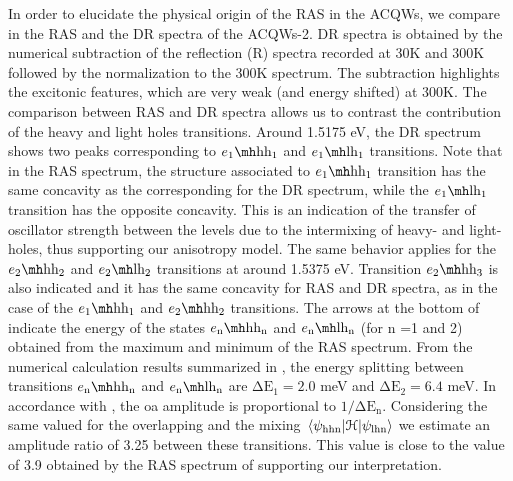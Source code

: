 In order to elucidate the physical origin of the RAS in the \gls{ACQWs}, we compare in  the RAS and the DR spectra of the \gls{ACQWs}-2. DR spectra is obtained by the numerical subtraction of the reflection (\gls{R}) spectra recorded at 30K and 300K followed by the normalization to the 300K spectrum. The subtraction highlights the excitonic features, which are very weak (and energy shifted) at 300K. The comparison between RAS and DR spectra allows us to contrast the contribution of the heavy and light holes transitions. Around 1.5175 eV, the DR spectrum shows two peaks corresponding to  $\thh{1}{1}$ and  $\tlh{1}{1}$ transitions. Note that in the RAS spectrum, the structure associated to $\thh{1}{1}$ transition has the same concavity as the corresponding for the DR spectrum, while the  $\tlh{1}{1}$ transition has the opposite concavity. This  is an indication of the transfer of oscillator strength between the levels due to the intermixing of heavy- and light- holes, thus supporting our anisotropy model. The same behavior applies for the $\thh{2}{2}$ and $\tlh{2}{2}$ transitions at around 1.5375 eV. Transition  $\thh{2}{3}$ is also indicated and it has the same concavity for RAS and DR spectra, as in the case of the $\thh{1}{1}$ and  $\thh{2}{2}$ transitions.
The arrows at the bottom of  indicate the energy of the states $\thh{\text{n}}{\text{n}}$ and $\tlh{\text{n}}{\text{n}}$ (for n =1 and 2) obtained from the  maximum and minimum of the RAS spectrum. 
From the numerical calculation results summarized in  , the energy splitting between transitions  $\thh{\text{n}}{\text{n}}$ and  $\tlh{\text{n}}{\text{n}}$  are $\mathrm{\Delta E_1}=2.0$ meV and $\mathrm{\Delta E_2}=6.4$ meV. In accordance with , the \gls{oa} amplitude is proportional to $1/\mathrm{\Delta E_n}$. Considering the same valued for the overlapping and the mixing $\mel{\psi_{\mathrm{hhn}}}{\cal{H}}{\psi_{\mathrm{lhn}}}$ we estimate an amplitude ratio of 3.25 between these transitions. This value is close to the value of 3.9 obtained by the RAS spectrum of  supporting our interpretation.

